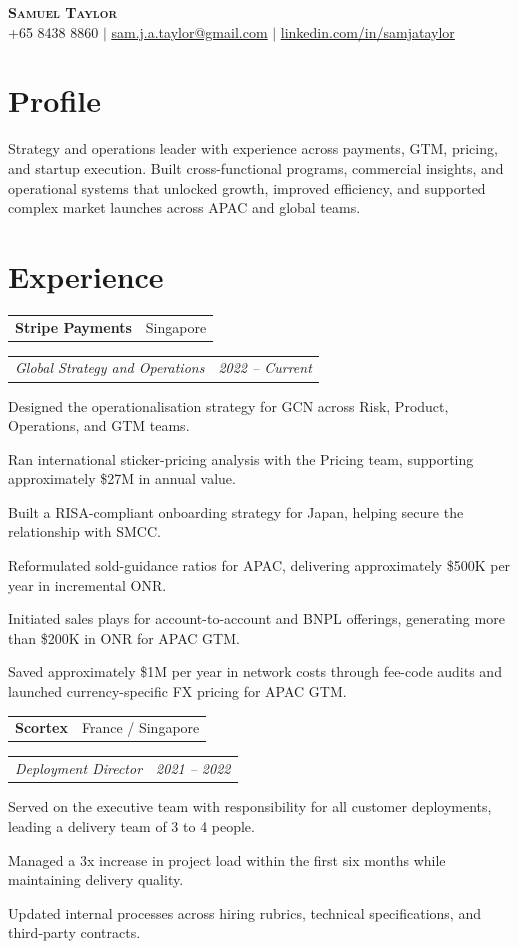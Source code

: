 \documentclass[letterpaper,11pt]{article}
\makeatletter
\newcommand{\resumeCompanyHeading}[2]{
  \par\addvspace{0.95\baselineskip}
  \noindent\begin{tabular*}{\textwidth}[t]{@{}l@{\extracolsep{\fill}}r@{}}
      \textbf{#1} & \small #2 \\
    \end{tabular*}\par
  \vspace{0.28\baselineskip}
}
\newcommand{\resumeRoleHeading}[2]{
  \par\addvspace{0.45\baselineskip}
  \noindent\begin{tabular*}{\textwidth}[t]{@{}l@{\extracolsep{\fill}}r@{}}
      \textit{\small#1} & \textit{\small #2} \\
    \end{tabular*}\par
  \vspace{0.10\baselineskip}
}
\newcommand{\resumeBullet}[1]{
  \par\noindent\small\makebox[0pt][r]{\raisebox{0.25ex}{\tiny$\bullet$}\hspace{0.6em}}#1\par
  \vspace{1pt}
}
\makeatother
\begin{document}
\begin{center}
    \textbf{\Huge \scshape Samuel Taylor} \\ \vspace{1pt}
    \small +65 8438 8860 $|$ \href{mailto:sam.j.a.taylor@gmail.com}{\underline{sam.j.a.taylor@gmail.com}} $|$
    \href{https://www.linkedin.com/in/samjataylor}{\underline{linkedin.com/in/samjataylor}}
\end{center}

\section{Profile}
\small{
Strategy and operations leader with experience across payments, GTM, pricing, and startup execution. Built cross-functional programs, commercial insights, and operational systems that unlocked growth, improved efficiency, and supported complex market launches across APAC and global teams.
}

\section{Experience}
\resumeCompanyHeading
  {Stripe Payments}{Singapore}
\resumeRoleHeading
  {Global Strategy and Operations}{2022 -- Current}
\resumeBullet{Designed the operationalisation strategy for GCN across Risk, Product, Operations, and GTM teams.}
\resumeBullet{Ran international sticker-pricing analysis with the Pricing team, supporting approximately \$27M in annual value.}
\resumeBullet{Built a RISA-compliant onboarding strategy for Japan, helping secure the relationship with SMCC.}
\resumeBullet{Reformulated sold-guidance ratios for APAC, delivering approximately \$500K per year in incremental ONR.}
\resumeBullet{Initiated sales plays for account-to-account and BNPL offerings, generating more than \$200K in ONR for APAC GTM.}
\resumeBullet{Saved approximately \$1M per year in network costs through fee-code audits and launched currency-specific FX pricing for APAC GTM.}

\resumeCompanyHeading
  {Scortex}{France / Singapore}
\resumeRoleHeading
  {Deployment Director}{2021 -- 2022}
\resumeBullet{Served on the executive team with responsibility for all customer deployments, leading a delivery team of 3 to 4 people.}
\resumeBullet{Managed a 3x increase in project load within the first six months while maintaining delivery quality.}
\resumeBullet{Updated internal processes across hiring rubrics, technical specifications, and third-party contracts.}
\end{document}
